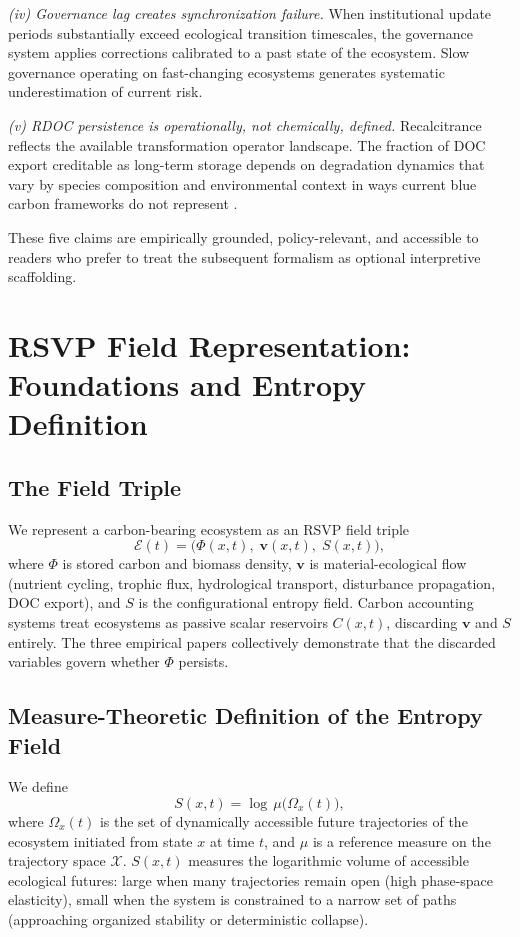\documentclass[12pt]{article}
\newcommand{\Ecal}{\mathcal{E}}
\newcommand{\Xcal}{\mathcal{X}}
\begin{document}
\textit{(iv) Governance lag creates synchronization failure.} When institutional update
periods substantially exceed ecological transition timescales, the governance system
applies corrections calibrated to a past state of the ecosystem. Slow governance operating
on fast-changing ecosystems generates systematic underestimation of current risk.

\textit{(v) RDOC persistence is operationally, not chemically, defined.} Recalcitrance
reflects the available transformation operator landscape. The fraction of DOC export
creditable as long-term storage depends on degradation dynamics that vary by species
composition and environmental context in ways current blue carbon frameworks do not
represent \citep{Watanabe2026}.

These five claims are empirically grounded, policy-relevant, and accessible to readers
who prefer to treat the subsequent formalism as optional interpretive scaffolding.

\section{RSVP Field Representation: Foundations and Entropy Definition}

\subsection{The Field Triple}

We represent a carbon-bearing ecosystem as an RSVP field triple
\begin{equation}
\Ecal(t) = \bigl(\Phi(x,t),\;\mathbf{v}(x,t),\;S(x,t)\bigr),
\end{equation}
where $\Phi$ is stored carbon and biomass density, $\mathbf{v}$ is material-ecological flow
(nutrient cycling, trophic flux, hydrological transport, disturbance propagation, DOC
export), and $S$ is the configurational entropy field. Carbon accounting systems treat
ecosystems as passive scalar reservoirs $C(x,t)$, discarding $\mathbf{v}$ and $S$ entirely.
The three empirical papers collectively demonstrate that the discarded variables govern
whether $\Phi$ persists.

\subsection{Measure-Theoretic Definition of the Entropy Field}

We define
\begin{equation}
\label{eq:entropy-def}
S(x,t) = \log\,\mu\!\bigl(\Omega_x(t)\bigr),
\end{equation}
where $\Omega_x(t)$ is the set of dynamically accessible future trajectories of the
ecosystem initiated from state $x$ at time $t$, and $\mu$ is a reference measure on the
trajectory space $\Xcal$. $S(x,t)$ measures the logarithmic volume of accessible
ecological futures: large when many trajectories remain open (high phase-space elasticity),
small when the system is constrained to a narrow set of paths (approaching organized
stability or deterministic collapse).
\end{document}

